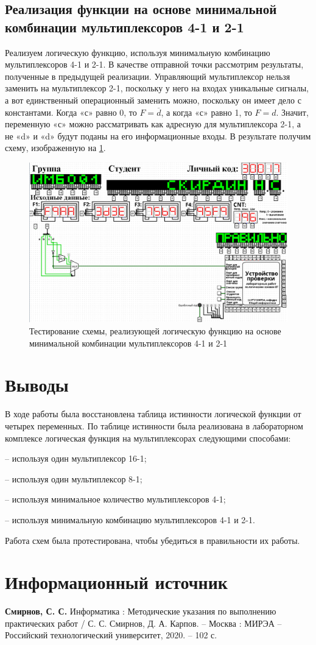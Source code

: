 \documentclass[14pt, a4paper]{extreport}
\begin{document}
\section{Реализация функции на основе минимальной комбинации мультиплексоров 4-1 и 2-1}
Реализуем логическую функцию, используя минимальную комбинацию мультиплексоров 4-1 и 2-1. В качестве отправной точки рассмотрим результаты, полученные в предыдущей реализации. Управляющий мультиплексор нельзя заменить на мультиплексор 2-1, поскольку у него на входах уникальные сигналы, а вот единственный операционный заменить можно, поскольку он имеет дело с константами. Когда «с» равно 0, то $F = \overline{d}$, а когда «с» равно 1, то $F = d$. Значит, переменную «с» можно рассматривать как адресную для мультиплексора 2-1, а не «d» и «d» будут поданы на его информационные входы. В результате получим схему, изображенную на \cref{fig:multiplexer-2-1}.

\begin{figure}[H]
	\caption{Тестирование схемы, реализующей логическую функцию на основе минимальной комбинации мультиплексоров 4-1 и 2-1}
	\label{fig:multiplexer-2-1}
	\includegraphics[width=\textwidth]{multiplexer-2-1}
\end{figure}

\chapter{Выводы}
В ходе работы была восстановлена таблица истинности логической функции от четырех переменных. По таблице истинности была реализована в лабораторном комплексе логическая функция на мультиплексорах следующими способами:

– используя один мультиплексор 16-1;

– используя один мультиплексор 8-1;

– используя минимальное количество мультиплексоров 4-1;

– используя минимальную комбинацию мультиплексоров 4-1 и 2-1.

Работа схем была протестирована, чтобы убедиться в правильности их работы.

\chapter{Информационный источник}
\textbf{Смирнов, С. С.} Информатика : Методические указания по выполнению практических работ / С. С. Смирнов, Д. А. Карпов. -- Москва : МИРЭА -- Российский технологический университет, 2020. -- 102 с.
\end{document}
